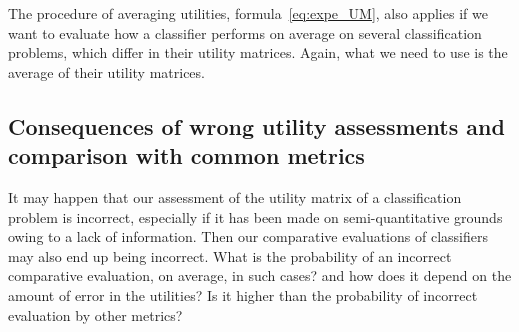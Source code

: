 \documentclass[\ifafour a4paper,12pt,\else a5paper,10pt,\fi%
onecolumn,oneside,article,%
british%
]{memoir}
\theoremstyle{remark}
\theoremstyle{innote}
\renewcommand*{\|}[1][]{\nonscript\:#1\vert\nonscript\:\mathopen{}}
\begin{document}
\medskip

The procedure of averaging utilities, formula~\eqref{eq:expe_UM}, also applies if we want to evaluate how a classifier performs on average on several classification problems, which differ in their utility matrices. Again, what we need to use is the average of their utility matrices.



\subsection{Consequences of wrong utility assessments and comparison with common metrics}
\label{sec:wrong_utility_assess}

It may happen that our assessment of the utility matrix of a classification problem is incorrect, especially if it has been made on semi-quantitative grounds owing to a lack of information. Then our comparative evaluations of classifiers may also end up being incorrect. What is the probability of an incorrect comparative evaluation, on average, in such cases? and how does it depend on the amount of error in the utilities? Is it higher than the probability of incorrect evaluation by other metrics?
\end{document}
